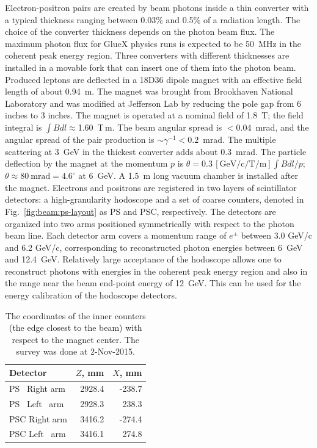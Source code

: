 Electron-positron pairs are created by beam photons inside a thin
converter with a typical thickness ranging between 0.03\% and 0.5\% of
a radiation length. The choice of the converter thickness depends on
the photon beam flux. The maximum photon flux for GlueX physics runs
is expected to be 50~MHz in the coherent peak energy region. Three
converters with different thicknesses are installed in a movable fork
that can insert one of them into the photon beam. Produced leptons are
deflected in a 18D36 dipole magnet with an effective field length of
about 0.94~m. The magnet was brought from Brookhaven National
Laboratory and was modified at Jefferson Lab by reducing the pole gap
from 6 inches to 3 inches. The magnet is operated at a nominal field
of 1.8~T; the field integral is $\int{}Bdl\approx$1.60~T\,m. The beam
angular spread is $<0.04$~mrad, and the angular spread of the pair
production is $\sim{}\gamma^{-1}<0.2$~mrad. The multiple scattering at
3~GeV in the thickest converter adds about 0.3~mrad. The particle
deflection by the magnet at the momentum $p$ is
$\theta{}=0.3\,[\mathrm{GeV/c/T/m}]\int{}Bdl/p$;
$\theta\approx{}80~\mathrm{mrad}=4.6^\circ$ at 6~GeV.  
A 1.5~m long
vacuum chamber is installed after the magnet. Electrons and positrons
are registered in two layers of scintillator detectors: a
high-granularity hodoscope and a set of coarse counters, denoted in
Fig.~\ref{fig:beam:ps-layout} as PS and PSC, respectively. The
detectors are organized into two arms positioned symmetrically with
respect to the photon beam line.  Each detector arm covers a momentum
range of $e^\pm$ between 3.0 GeV/c and 6.2 GeV/c, corresponding to
reconstructed photon energies between 6~GeV and 12.4~GeV. Relatively
large acceptance of the hodoscope allows one to reconstruct photons
with energies in the coherent peak energy region and also in the range
near the beam end-point energy of 12~GeV. This can be used for the
energy calibration of the hodoscope detectors.

\begin{table}[h]
  \begin{center}
    \caption{The coordinates of the inner counters (the edge closest to the beam)
             with respect to the magnet center. The survey was done at 2-Nov-2015. 
       \label{tab:beam:ps-ccordinates}
    }
    \begin{tabular}{l|r|r}
       \hline
       Detector & $Z$, mm & $X$, mm \\
       \hline
       \hline
       PS~ Right arm & 2928.4 & -238.7 \\
       PS~ Left~ arm & 2928.3 &  238.3 \\
       PSC Right arm & 3416.2 & -274.4 \\
       PSC Left~ arm & 3416.1 & ~274.8 \\
       \hline
    \end{tabular}
  \end{center}
\end{table}

